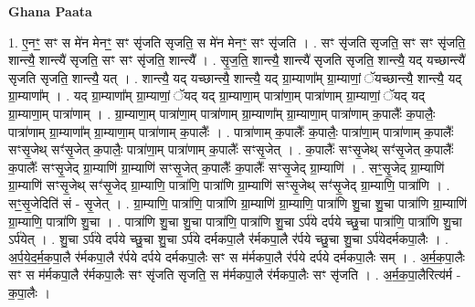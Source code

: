 \documentclass[17pt]{extarticle}
\begin{document}
\textbf{Ghana Paata } \newline

1. ए॒नꣳ॒॒ सꣳ स मे॑न मेनꣳ॒॒ सꣳ सृ॑जति सृजति॒ स मे॑न मेनꣳ॒॒ सꣳ सृ॑जति । . सꣳ सृ॑जति सृजति॒ सꣳ सꣳ सृ॑जति॒ शान्त्यै॒ शान्त्यै॑ सृजति॒ सꣳ सꣳ सृ॑जति॒ शान्त्यै᳚ । . सृ॒ज॒ति॒ शान्त्यै॒ शान्त्यै॑ सृजति सृजति॒ शान्त्यै॒ यद् यच्छान्त्यै॑ सृजति सृजति॒ शान्त्यै॒ यत् । . शान्त्यै॒ यद् यच्छान्त्यै॒ शान्त्यै॒ यद् ग्रा॒म्याणा᳚म् ग्रा॒म्याणां॒ ॅयच्छान्त्यै॒ शान्त्यै॒ यद् ग्रा॒म्याणा᳚म् । . यद् ग्रा॒म्याणा᳚म् ग्रा॒म्याणां॒ ॅयद् यद् ग्रा॒म्याणा॒म् पात्रा॑णा॒म् पात्रा॑णाम् ग्रा॒म्याणां॒ ॅयद् यद् ग्रा॒म्याणा॒म् पात्रा॑णाम् । . ग्रा॒म्याणा॒म् पात्रा॑णा॒म् पात्रा॑णाम् ग्रा॒म्याणा᳚म् ग्रा॒म्याणा॒म् पात्रा॑णाम् क॒पालैः᳚ क॒पालैः॒ पात्रा॑णाम् ग्रा॒म्याणा᳚म् ग्रा॒म्याणा॒म् पात्रा॑णाम् क॒पालैः᳚ । . पात्रा॑णाम् क॒पालैः᳚ क॒पालैः॒ पात्रा॑णा॒म् पात्रा॑णाम् क॒पालैः᳚ सꣳसृ॒जेथ् सꣳ॑सृ॒जेत् क॒पालैः॒ पात्रा॑णा॒म् पात्रा॑णाम् क॒पालैः᳚ सꣳसृ॒जेत् । . क॒पालैः᳚ सꣳसृ॒जेथ् सꣳ॑सृ॒जेत् क॒पालैः᳚ क॒पालैः᳚ सꣳसृ॒जेद् ग्रा॒म्याणि॑ ग्रा॒म्याणि॑ सꣳसृ॒जेत् क॒पालैः᳚ क॒पालैः᳚ सꣳसृ॒जेद् ग्रा॒म्याणि॑ । . सꣳ॒॒सृ॒जेद् ग्रा॒म्याणि॑ ग्रा॒म्याणि॑ सꣳसृ॒जेथ् सꣳ॑सृ॒जेद् ग्रा॒म्याणि॒ पात्रा॑णि॒ पात्रा॑णि ग्रा॒म्याणि॑ सꣳसृ॒जेथ् सꣳ॑सृ॒जेद् ग्रा॒म्याणि॒ पात्रा॑णि । . सꣳ॒॒सृ॒जेदिति॑ सं - सृ॒जेत् । . ग्रा॒म्याणि॒ पात्रा॑णि॒ पात्रा॑णि ग्रा॒म्याणि॑ ग्रा॒म्याणि॒ पात्रा॑णि शु॒चा शु॒चा पात्रा॑णि ग्रा॒म्याणि॑ ग्रा॒म्याणि॒ पात्रा॑णि शु॒चा । . पात्रा॑णि शु॒चा शु॒चा पात्रा॑णि॒ पात्रा॑णि शु॒चा ऽर्प॑ये दर्पये च्छु॒चा पात्रा॑णि॒ पात्रा॑णि शु॒चा ऽर्प॑येत् । . शु॒चा ऽर्प॑ये दर्पये च्छु॒चा शु॒चा ऽर्प॑ये दर्मकपा॒लै र॑र्मकपा॒लै र॑र्पये च्छु॒चा शु॒चा ऽर्प॑येदर्मकपा॒लैः । . अ॒र्प॒ये॒द॒र्म॒क॒पा॒लै र॑र्मकपा॒लै र॑र्पये दर्पये दर्मकपा॒लैः सꣳ स म॑र्मकपा॒लै र॑र्पये दर्पये दर्मकपा॒लैः सम् । . अ॒र्म॒क॒पा॒लैः सꣳ स म॑र्मकपा॒लै र॑र्मकपा॒लैः सꣳ सृ॑जति सृजति॒ स म॑र्मकपा॒लै र॑र्मकपा॒लैः सꣳ सृ॑जति । . अ॒र्म॒क॒पा॒लैरित्य॑र्म - क॒पा॒लैः । \newline
\end{document}
